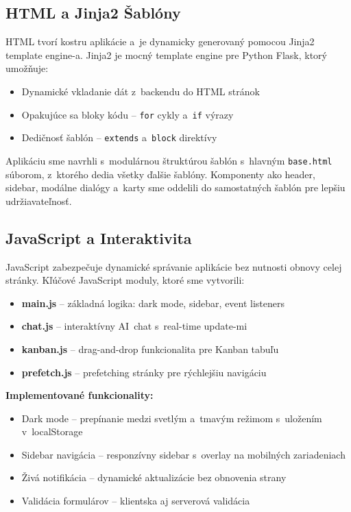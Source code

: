 \subsection{HTML a Jinja2 Šablóny}

        HTML tvorí kostru aplikácie a~je dynamicky generovaný pomocou Jinja2 template
engine-a. Jinja2 je mocný template engine pre Python Flask, ktorý umožňuje:

\begin{itemize}
  \item Dynamické vkladanie dát z~backendu do HTML stránok
  \item Opakujúce sa bloky kódu -- \texttt{for} cykly a~\texttt{if} výrazy
  \item Dedičnosť šablón -- \texttt{extends} a~\texttt{block} direktívy
\end{itemize}

        Aplikáciu sme navrhli s~modulárnou štruktúrou šablón s~hlavným \texttt{base.html} súborom,
z~ktorého dedia všetky ďalšie šablóny. Komponenty ako header, sidebar, modálne
dialógy a~karty sme oddelili do samostatných šablón pre lepšiu udržiavateľnosť.

\subsection{JavaScript a Interaktivita}

        JavaScript zabezpečuje dynamické správanie aplikácie bez nutnosti obnovy celej
stránky. Kľúčové JavaScript moduly, ktoré sme vytvorili:

\begin{itemize}
  \item \textbf{main.js} -- základná logika: dark mode, sidebar, event listeners
  \item \textbf{chat.js} -- interaktívny AI~chat s~real-time update-mi
  \item \textbf{kanban.js} -- drag-and-drop funkcionalita pre Kanban tabuľu
  \item \textbf{prefetch.js} -- prefetching stránky pre rýchlejšiu navigáciu
\end{itemize}

        \textbf{Implementované funkcionality:}

\begin{itemize}
  \item Dark mode -- prepínanie medzi svetlým a~tmavým režimom s~uložením v~localStorage
  \item Sidebar navigácia -- responzívny sidebar s~overlay na mobilných zariadeniach
  \item Živá notifikácia -- dynamické aktualizácie bez obnovenia strany
  \item Validácia formulárov -- klientska aj serverová validácia
\end{itemize}

